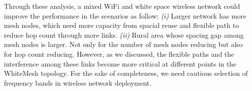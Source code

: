 Through these analysis, a mixed WiFi and white space wireless network could improve the performance 
in the scenarios as follow: 
{\it (i)} Larger network has more mesh nodes, which 
need more capacity from spacial reuse and flexible path to reduce hop count through
more links. 
{\it (ii)} Rural area whose spacing gap among mesh nodes is larger.
Not only for the number of mesh nodes reducing but also for hop count reducing.
However, as we discussed, the flexible paths and the interference among these
links become more critical at different points in the WhiteMesh topology. 
For the sake of completeness, we need cautious selection of frequency bands
in wireless network deployment.


